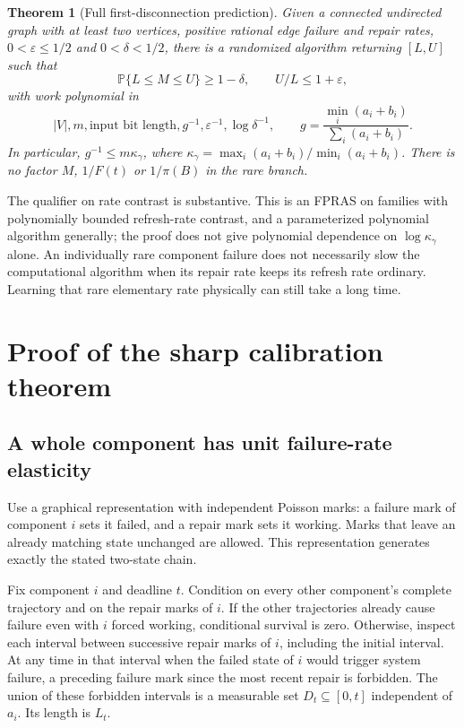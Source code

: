 \documentclass[11pt,a4paper]{article}
\newtheorem{theorem}{Theorem}
\newcommand{\Pp}{\mathbb P}
\begin{document}
\begin{theorem}[Full first-disconnection prediction]\label{thm:algorithm}
Given a connected undirected graph with at least two vertices, positive rational edge failure and repair rates, $0<\varepsilon\le1/2$ and $0<\delta<1/2$, there is a randomized algorithm returning $[L,U]$ such that
\[
\Pp\{L\le M\le U\}\ge1-\delta,\qquad U/L\le1+\varepsilon,
\]
with work polynomial in
\[
 |V|,m,\text{input bit length},g^{-1},\varepsilon^{-1},\log\delta^{-1},
 \qquad
 g=\frac{\min_i(a_i+b_i)}{\sum_i(a_i+b_i)}.
\]
In particular, $g^{-1}\le m\kappa_\gamma$, where
$\kappa_\gamma=\max_i(a_i+b_i)/\min_i(a_i+b_i)$.
There is no factor $M$, $1/F(t)$ or $1/\pi(B)$ in the rare branch.
\end{theorem}

The qualifier on rate contrast is substantive. This is an FPRAS on families with polynomially bounded refresh-rate contrast, and a parameterized polynomial algorithm generally; the proof does not give polynomial dependence on $\log\kappa_\gamma$ alone. An individually rare component failure does not necessarily slow the computational algorithm when its repair rate keeps its refresh rate ordinary. Learning that rare elementary rate physically can still take a long time.

\section{Proof of the sharp calibration theorem}
\subsection{A whole component has unit failure-rate elasticity}
Use a graphical representation with independent Poisson marks: a failure mark of component $i$ sets it failed, and a repair mark sets it working. Marks that leave an already matching state unchanged are allowed. This representation generates exactly the stated two-state chain.

Fix component $i$ and deadline $t$. Condition on every other component's complete trajectory and on the repair marks of $i$. If the other trajectories already cause failure even with $i$ forced working, conditional survival is zero. Otherwise, inspect each interval between successive repair marks of $i$, including the initial interval. At any time in that interval when the failed state of $i$ would trigger system failure, a preceding failure mark since the most recent repair is forbidden. The union of these forbidden intervals is a measurable set $D_t\subseteq[0,t]$ independent of $a_i$. Its length is $L_t$.
\end{document}
